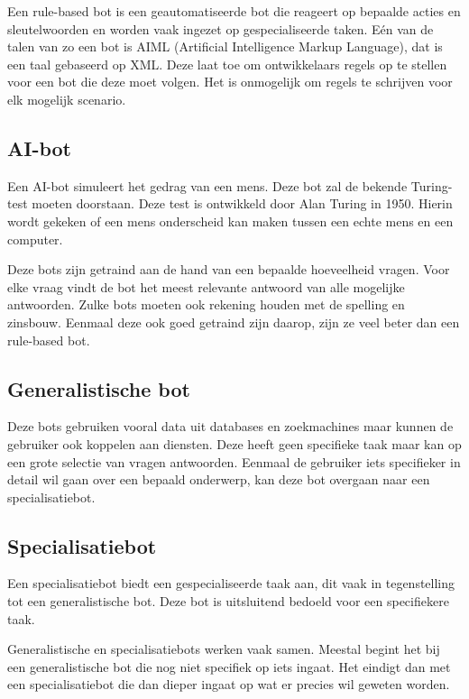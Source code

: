 Een rule-based bot is een geautomatiseerde bot die reageert op bepaalde acties en sleutelwoorden en worden vaak ingezet op gespecialiseerde taken. Eén van de talen van zo een bot is AIML (Artificial Intelligence Markup Language), dat is een taal gebaseerd op XML. Deze laat toe om ontwikkelaars regels op te stellen voor een bot die deze moet volgen. Het is onmogelijk om regels te schrijven voor elk mogelijk scenario. ~\autocite{Kumar2017}

\subsection{AI-bot}
\label{AI-bot}

Een AI-bot simuleert het gedrag van een mens. Deze bot zal de bekende Turing-test moeten doorstaan. Deze test is ontwikkeld door Alan Turing in 1950. Hierin wordt gekeken of een mens onderscheid kan maken tussen een echte mens en een computer.

Deze bots zijn getraind aan de hand van een bepaalde hoeveelheid vragen. Voor elke vraag vindt de bot het meest relevante antwoord van alle mogelijke antwoorden. Zulke bots moeten ook rekening houden met de spelling en zinsbouw. Eenmaal deze ook goed getraind zijn daarop, zijn ze veel beter dan een rule-based bot.

\subsection{Generalistische bot}
\label{Generalistische bot}

Deze bots gebruiken vooral data uit databases en zoekmachines maar kunnen de gebruiker ook koppelen aan diensten. Deze heeft geen specifieke taak maar kan op een grote selectie van vragen antwoorden. Eenmaal de gebruiker iets specifieker in detail wil gaan over een bepaald onderwerp, kan deze bot overgaan naar een specialisatiebot.

\subsection{Specialisatiebot}
\label{Specialisatiebot}

Een specialisatiebot biedt een gespecialiseerde taak aan, dit vaak in tegenstelling tot een generalistische bot. Deze bot is uitsluitend bedoeld voor een specifiekere taak.

Generalistische en specialisatiebots werken vaak samen. Meestal begint het bij een generalistische bot die nog niet specifiek op iets ingaat. Het eindigt dan met een specialisatiebot die dan dieper ingaat op wat er precies wil geweten worden.

